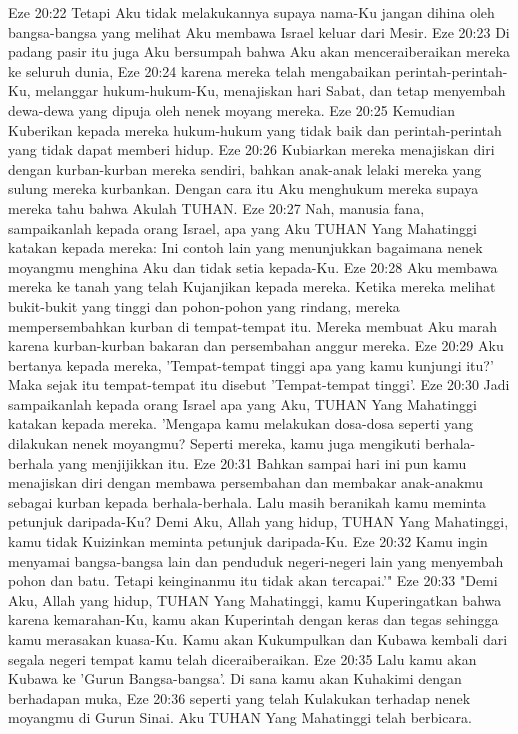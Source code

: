Eze 20:22  Tetapi Aku tidak melakukannya supaya nama-Ku jangan dihina oleh bangsa-bangsa yang melihat Aku membawa Israel keluar dari Mesir.
Eze 20:23  Di padang pasir itu juga Aku bersumpah bahwa Aku akan menceraiberaikan mereka ke seluruh dunia,
Eze 20:24  karena mereka telah mengabaikan perintah-perintah-Ku, melanggar hukum-hukum-Ku, menajiskan hari Sabat, dan tetap menyembah dewa-dewa yang dipuja oleh nenek moyang mereka.
Eze 20:25  Kemudian Kuberikan kepada mereka hukum-hukum yang tidak baik dan perintah-perintah yang tidak dapat memberi hidup.
Eze 20:26  Kubiarkan mereka menajiskan diri dengan kurban-kurban mereka sendiri, bahkan anak-anak lelaki mereka yang sulung mereka kurbankan. Dengan cara itu Aku menghukum mereka supaya mereka tahu bahwa Akulah TUHAN.
Eze 20:27  Nah, manusia fana, sampaikanlah kepada orang Israel, apa yang Aku TUHAN Yang Mahatinggi katakan kepada mereka: Ini contoh lain yang menunjukkan bagaimana nenek moyangmu menghina Aku dan tidak setia kepada-Ku.
Eze 20:28  Aku membawa mereka ke tanah yang telah Kujanjikan kepada mereka. Ketika mereka melihat bukit-bukit yang tinggi dan pohon-pohon yang rindang, mereka mempersembahkan kurban di tempat-tempat itu. Mereka membuat Aku marah karena kurban-kurban bakaran dan persembahan anggur mereka.
Eze 20:29  Aku bertanya kepada mereka, 'Tempat-tempat tinggi apa yang kamu kunjungi itu?' Maka sejak itu tempat-tempat itu disebut 'Tempat-tempat tinggi'.
Eze 20:30  Jadi sampaikanlah kepada orang Israel apa yang Aku, TUHAN Yang Mahatinggi katakan kepada mereka. 'Mengapa kamu melakukan dosa-dosa seperti yang dilakukan nenek moyangmu? Seperti mereka, kamu juga mengikuti berhala-berhala yang menjijikkan itu.
Eze 20:31  Bahkan sampai hari ini pun kamu menajiskan diri dengan membawa persembahan dan membakar anak-anakmu sebagai kurban kepada berhala-berhala. Lalu masih beranikah kamu meminta petunjuk daripada-Ku? Demi Aku, Allah yang hidup, TUHAN Yang Mahatinggi, kamu tidak Kuizinkan meminta petunjuk daripada-Ku.
Eze 20:32  Kamu ingin menyamai bangsa-bangsa lain dan penduduk negeri-negeri lain yang menyembah pohon dan batu. Tetapi keinginanmu itu tidak akan tercapai.'"
Eze 20:33  "Demi Aku, Allah yang hidup, TUHAN Yang Mahatinggi, kamu Kuperingatkan bahwa karena kemarahan-Ku, kamu akan Kuperintah dengan keras dan tegas sehingga kamu merasakan kuasa-Ku. Kamu akan Kukumpulkan dan Kubawa kembali dari segala negeri tempat kamu telah diceraiberaikan.
Eze 20:35  Lalu kamu akan Kubawa ke 'Gurun Bangsa-bangsa'. Di sana kamu akan Kuhakimi dengan berhadapan muka,
Eze 20:36  seperti yang telah Kulakukan terhadap nenek moyangmu di Gurun Sinai. Aku TUHAN Yang Mahatinggi telah berbicara.
